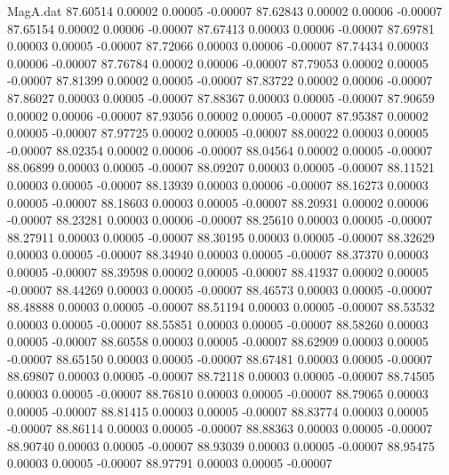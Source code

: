 \begin{filecontents}{MagA.dat}
  87.60514    0.00002    0.00005   -0.00007
  87.62843    0.00002    0.00006   -0.00007
  87.65154    0.00002    0.00006   -0.00007
  87.67413    0.00003    0.00006   -0.00007
  87.69781    0.00003    0.00005   -0.00007
  87.72066    0.00003    0.00006   -0.00007
  87.74434    0.00003    0.00006   -0.00007
  87.76784    0.00002    0.00006   -0.00007
  87.79053    0.00002    0.00005   -0.00007
  87.81399    0.00002    0.00005   -0.00007
  87.83722    0.00002    0.00006   -0.00007
  87.86027    0.00003    0.00005   -0.00007
  87.88367    0.00003    0.00005   -0.00007
  87.90659    0.00002    0.00006   -0.00007
  87.93056    0.00002    0.00005   -0.00007
  87.95387    0.00002    0.00005   -0.00007
  87.97725    0.00002    0.00005   -0.00007
  88.00022    0.00003    0.00005   -0.00007
  88.02354    0.00002    0.00006   -0.00007
  88.04564    0.00002    0.00005   -0.00007
  88.06899    0.00003    0.00005   -0.00007
  88.09207    0.00003    0.00005   -0.00007
  88.11521    0.00003    0.00005   -0.00007
  88.13939    0.00003    0.00006   -0.00007
  88.16273    0.00003    0.00005   -0.00007
  88.18603    0.00003    0.00005   -0.00007
  88.20931    0.00002    0.00006   -0.00007
  88.23281    0.00003    0.00006   -0.00007
  88.25610    0.00003    0.00005   -0.00007
  88.27911    0.00003    0.00005   -0.00007
  88.30195    0.00003    0.00005   -0.00007
  88.32629    0.00003    0.00005   -0.00007
  88.34940    0.00003    0.00005   -0.00007
  88.37370    0.00003    0.00005   -0.00007
  88.39598    0.00002    0.00005   -0.00007
  88.41937    0.00002    0.00005   -0.00007
  88.44269    0.00003    0.00005   -0.00007
  88.46573    0.00003    0.00005   -0.00007
  88.48888    0.00003    0.00005   -0.00007
  88.51194    0.00003    0.00005   -0.00007
  88.53532    0.00003    0.00005   -0.00007
  88.55851    0.00003    0.00005   -0.00007
  88.58260    0.00003    0.00005   -0.00007
  88.60558    0.00003    0.00005   -0.00007
  88.62909    0.00003    0.00005   -0.00007
  88.65150    0.00003    0.00005   -0.00007
  88.67481    0.00003    0.00005   -0.00007
  88.69807    0.00003    0.00005   -0.00007
  88.72118    0.00003    0.00005   -0.00007
  88.74505    0.00003    0.00005   -0.00007
  88.76810    0.00003    0.00005   -0.00007
  88.79065    0.00003    0.00005   -0.00007
  88.81415    0.00003    0.00005   -0.00007
  88.83774    0.00003    0.00005   -0.00007
  88.86114    0.00003    0.00005   -0.00007
  88.88363    0.00003    0.00005   -0.00007
  88.90740    0.00003    0.00005   -0.00007
  88.93039    0.00003    0.00005   -0.00007
  88.95475    0.00003    0.00005   -0.00007
  88.97791    0.00003    0.00005   -0.00007

\end{filecontents}
